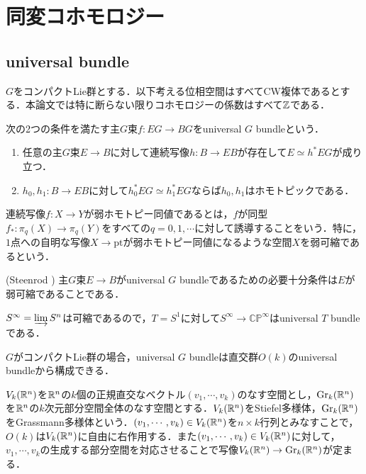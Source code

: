 \section{同変コホモロジー}
\subsection{universal bundle}

$G$をコンパクトLie群とする．以下考える位相空間はすべてCW複体であるとする．本論文では特に断らない限りコホモロジーの係数はすべて$\mathbb{Z}$である．

\begin{defin}
  次の2つの条件を満たす主$G$束$f\colon EG\rightarrow BG$をuniversal $G$ bundleという．
  \begin{enumerate}
    \item 任意の主$G$束$E\rightarrow B$に対して連続写像$h\colon B\rightarrow EB$が存在して$E\simeq h^*EG$が成り立つ．
    \item $h_0,h_1\colon B\rightarrow EB$に対して$h_0^*EG\simeq h_1^*EG$ならば$h_0,h_1$はホモトピックである．
  \end{enumerate}
\end{defin}

\begin{defin}
  連続写像$f\colon X\rightarrow Y$が弱ホモトピー同値であるとは，$f$が同型$f_*\colon\pi_q(X)\rightarrow \pi_q(Y)$をすべての$q=0,1,\cdots$に対して誘導することをいう．特に，$1$点への自明な写像$X\rightarrow \text{pt}$が弱ホモトピー同値になるような空間$X$を弱可縮であるという．
\end{defin}

\begin{theo}(Steenrod \cite{steenrod})\label{steenrod}
  主$G$束$E\rightarrow B$がuniversal $G$ bundleであるための必要十分条件は$E$が弱可縮であることである．
\end{theo}

\begin{eg}
  $S^\infty=\varinjlim S^n$は可縮であるので，$T=S^1$に対して$S^\infty\rightarrow \mathbb{CP}^\infty$はuniversal $T$ bundleである．
\end{eg}

$G$がコンパクトLie群の場合，universal $G$ bundleは直交群$O(k)$のuniversal bundleから構成できる．

$V_k(\mathbb{R}^n)$を$\mathbb{R}^n$の$k$個の正規直交なベクトル$(v_1,\cdots,v_k)$のなす空間とし，$\text{Gr}_k(\mathbb{R}^n)$を$\mathbb{R}^n$の$k$次元部分空間全体のなす空間とする．$V_k(\mathbb{R}^n)$をStiefel多様体，$\text{Gr}_k(\mathbb{R}^n)$をGrassmann多様体という．$(v_1,\cdots,v_k)\in V_k(\mathbb{R}^n)$を$n\times k$行列とみなすことで，$O(k)$は$V_k(\mathbb{R}^n)$に自由に右作用する．また$(v_1,\cdots,v_k)\in V_k(\mathbb{R}^n)$に対して，$v_1,\cdots,v_k$の生成する部分空間を対応させることで写像$V_k(\mathbb{R}^n)\rightarrow \text{Gr}_k(\mathbb{R}^n)$が定まる．

